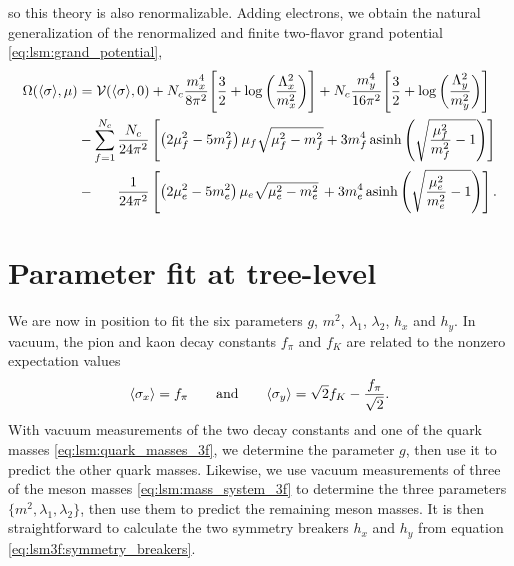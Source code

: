so this theory is also renormalizable.
Adding electrons, we obtain the natural generalization of the renormalized and finite two-flavor grand potential \eqref{eq:lsm:grand_potential},
\begin{equation}
\begin{split}
	\Omega(\avg{\sigma},\mu) &= \pot(\avg{\sigma},0) + N_c \frac{m_x^4}{8 \pi^2} \Bigg[ \frac{3}{2} + \log\bigg(\frac{\Lambda_x^2}{m_x^2}\bigg) \Bigg] + N_c \frac{m_y^4}{16 \pi^2} \Bigg[ \frac{3}{2} + \log\bigg(\frac{\Lambda_y^2}{m_y^2}\bigg) \Bigg] \\ %
	                         &-\smashoperator{\sum_{f=1}^{N_c}} \frac{N_c}{24 \pi^2} \left[ \left( 2 \mu_f^2 - 5 m_f^2 \right) \mu_f \sqrt{\mu_f^2 - m_f^2} + 3 m_f^4 \asinh \left( \sqrt{\frac{\mu_{\smash{f}}^2}{m_f^2}-1} \right) \right] \\
	                         &-\phantom{\sum} \, \frac{1}{24 \pi^2} \left[ \left( 2 \mu_e^2 - 5 m_e^2 \right) \mu_e \sqrt{\mu_e^2 - m_e^2} \, + 3 m_e^4 \asinh \left( \sqrt{\frac{\mu_{\smash{e}}^2}{m_e^2}-1} \right) \right].
\end{split}
\label{eq:lsm3f:grand_potential}
\end{equation}

\section{Parameter fit at tree-level}
\label{sec:lsm3f:parameter_fit}

We are now in position to fit the six parameters $g$, $m^2$, $\lambda_1$, $\lambda_2$, $h_x$ and $h_y$.
In vacuum, the pion and kaon decay constants $f_\pi$ and $f_K$ are related to the nonzero expectation values
\cite{ref:lsm3f_details}
\begin{equation}
	\langle \sigma_x \rangle = f_\pi
	\qquad \text{and} \qquad
	\langle \sigma_y \rangle = \sqrt{2} f_K - \frac{f_\pi}{\sqrt{2}}.
\label{eq:lsm3f:decay_constants}
\end{equation}
With vacuum measurements of the two decay constants and one of the quark masses \eqref{eq:lsm:quark_masses_3f},
we determine the parameter $g$, then use it to predict the other quark masses.
Likewise, we use vacuum measurements of three of the meson masses \eqref{eq:lsm:mass_system_3f} to determine the three parameters $\{m^2, \lambda_1, \lambda_2\}$,
then use them to predict the remaining meson masses.
It is then straightforward to calculate the two symmetry breakers $h_x$ and $h_y$ from equation \eqref{eq:lsm3f:symmetry_breakers}.

